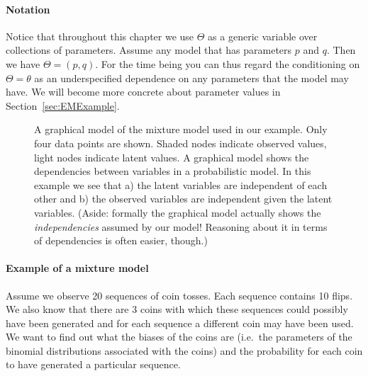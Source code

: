 \documentclass[11pt,leqno,a4paper]{report}\usepackage[]{graphicx}\usepackage[]{color}
\begin{document}
\paragraph{Notation} Notice that throughout this chapter we use $ \Theta $ as a generic variable over collections of parameters. Assume any
model that has parameters $ p $ and $ q $. Then we have $ \Theta = (p,q) $. For the time being you can thus regard the conditioning on $ \Theta = \theta $
as an underspecified dependence on any parameters that the model may have. We will become more concrete about parameter values in Section~\ref{sec:EMExample}.
\begin{figure}
\center
{}
\caption{A graphical model of the mixture model used in our
  example. Only four data points are shown. Shaded nodes indicate observed values, light nodes indicate
latent values. A graphical model shows the dependencies between variables in a probabilistic model. In this example we see that a) the latent variables
are independent of each other and b) the observed variables are independent given the latent variables. (Aside: formally the graphical model actually shows the
\textit{independencies} assumed by our model! Reasoning about it in terms of dependencies is often easier, though.)}
\label{fig:mixtureGraphical}
\end{figure}

\paragraph{Example of a mixture model} Assume we observe 20 sequences of coin tosses. Each sequence
contains 10 flips. We also know that there are 3 coins with which these sequences could possibly have been
generated and for each sequence a different coin may have been used. We want to find out what the biases
of the coins are (i.e.\ the parameters of the binomial distributions associated with the coins) and the probability
for each coin to have generated a particular sequence.
 
\end{document}
